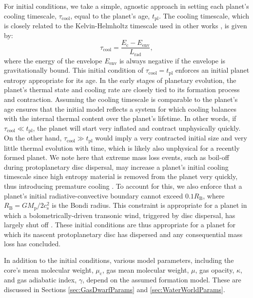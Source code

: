 \documentclass[fleqn,usenatbib]{mnras}
\begin{document}
For initial conditions, we take a simple, agnostic approach in setting each planet's cooling timescale, $\tau_\text{cool}$, equal to the planet's age, $t_\text{pl}$. The cooling timescale, which is closely related to the Kelvin-Helmholtz timescale used in other works \citep[e.g.][]{Owen2017,Owen2020}, is given by:
\begin{equation} \label{eq:coolingtimescale}
    \tau_\text{cool} = \frac{E_\text{c} - E_\text{env}}{L_\text{rad}},
\end{equation}
where the energy of the envelope $E_\text{env}$ is always negative if the envelope is gravitationally bound. This initial condition of $\tau_\text{cool} = t_\text{pl}$ enforces an initial planet entropy appropriate for its age. In the early stages of planetary evolution, the planet’s thermal state and cooling rate are closely tied to its formation process and contraction. Assuming the cooling timescale is comparable to the planet's age ensures that the initial model reflects a system for which cooling balances with the internal thermal content over the planet’s lifetime. In other words, if $\tau_\text{cool} \ll t_\text{pl}$, the planet will start very inflated and contract unphysically quickly. On the other hand, $\tau_\text{cool} \gg t_\text{pl}$ would imply a very contracted initial size and very little thermal evolution with time, which is likely also unphysical for a recently formed planet. We note here that extreme mass loss events, such as boil-off during protoplanetary disc dispersal, may increase a planet's initial cooling timescale since high entropy material is removed from the planet very quickly, thus introducing premature cooling \citep{Owen2016,Ginzburg2016,Owen2020,Rogers2024a,Tang2024}. To account for this, we also enforce that a planet's initial radiative-convective boundary cannot exceed $0.1 R_\text{B}$, where $R_\text{B} = G M_\text{p} / 2 c_\text{s}^2$ is the Bondi radius. This constraint is appropriate for a planet in which a bolometrically-driven transonic wind, triggered by disc dispersal, has largely shut off \cite[see][]{Owen2016}. These initial conditions are thus appropriate for a planet for which its nascent protoplanetary disc has dispersed and any consequential mass loss has concluded.

In addition to the initial conditions, various model parameters, including the core's mean molecular weight, $\mu_\text{c}$, gas mean molecular weight, $\mu$, gas opacity, $\kappa$, and gas adiabatic index, $\gamma$, depend on the assumed formation model. These are discussed in Sections \ref{sec:GasDwarfParams} and \ref{sec:WaterWorldParams}.
\end{document}
